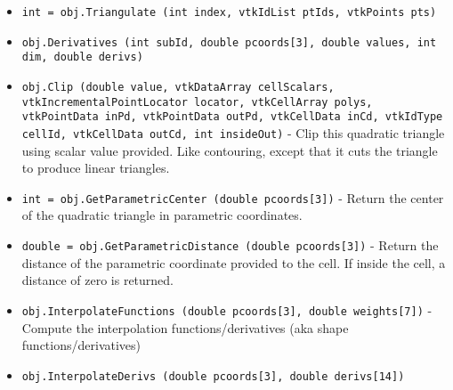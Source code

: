 \begin{itemize}
\item  \verb|int = obj.Triangulate (int index, vtkIdList ptIds, vtkPoints pts)|

\item  \verb|obj.Derivatives (int subId, double pcoords[3], double values, int dim, double derivs)|

\item  \verb|obj.Clip (double value, vtkDataArray cellScalars, vtkIncrementalPointLocator locator, vtkCellArray polys, vtkPointData inPd, vtkPointData outPd, vtkCellData inCd, vtkIdType cellId, vtkCellData outCd, int insideOut)| -  Clip this quadratic triangle using scalar value provided. Like
 contouring, except that it cuts the triangle to produce linear
 triangles.

\item  \verb|int = obj.GetParametricCenter (double pcoords[3])| -  Return the center of the quadratic triangle in parametric coordinates.

\item  \verb|double = obj.GetParametricDistance (double pcoords[3])| -  Return the distance of the parametric coordinate provided to the
 cell. If inside the cell, a distance of zero is returned.

\item  \verb|obj.InterpolateFunctions (double pcoords[3], double weights[7])| -  Compute the interpolation functions/derivatives
 (aka shape functions/derivatives)

\item  \verb|obj.InterpolateDerivs (double pcoords[3], double derivs[14])|

\end{itemize}
